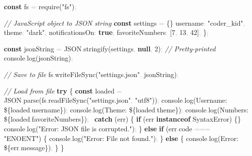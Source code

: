\documentclass[
  justified,
  openright,
]{tufte-book}
\newcommand{\KeywordTok}[1]{\textcolor{CodeKeyword}{\textbf{#1}}}  %
\newcommand{\StringTok}[1]{\textcolor{CodeString}{#1}}              %
\newcommand{\CommentTok}[1]{\textcolor{CodeComment}{\textit{#1}}}  %
\newcommand{\CodeNumTok}[1]{\textcolor{CodeNumber}{#1}}             %
\newcommand{\CodeFuncTok}[1]{\textcolor{CodeKeyword}{#1}}           %
\newcommand{\CodeTypeTok}[1]{\textcolor{CodeType}{#1}}              %
\newcommand{\CodeAccentTok}[1]{\textcolor{CodeAccent}{#1}}          %
\newcommand{\OperatorTok}[1]{\textcolor{DarkGray}{#1}}              %
\newenvironment{Shaded}{%
  \begin{mdframed}[style=TufteCode]%
}{%
  \end{mdframed}%
}
\begin{document}
\begin{Shaded}
\begin{Highlighting}[]
\KeywordTok{const} fs \OperatorTok{=} \CodeAccentTok{require}(\StringTok{"fs"})\OperatorTok{;}
 
\CommentTok{// JavaScript object to JSON string}
\KeywordTok{const} settings \OperatorTok{=} \{\}
  \CodeTypeTok{username}\OperatorTok{:} \StringTok{"coder\_kid"}\OperatorTok{,}
  \CodeTypeTok{theme}\OperatorTok{:} \StringTok{"dark"}\OperatorTok{,}
  \CodeTypeTok{notificationsOn}\OperatorTok{:} \KeywordTok{true}\OperatorTok{,}
  \CodeTypeTok{favoriteNumbers}\OperatorTok{:} [\CodeNumTok{7}\OperatorTok{,} \CodeNumTok{13}\OperatorTok{,} \CodeNumTok{42}]\OperatorTok{,}
\}\OperatorTok{;}
 
\KeywordTok{const} jsonString \OperatorTok{=} JSON\OperatorTok{.}\CodeFuncTok{stringify}(settings\OperatorTok{,} \KeywordTok{null}\OperatorTok{,} \CodeNumTok{2})\OperatorTok{;} \CommentTok{// Pretty{-}printed}
console\OperatorTok{.}\CodeFuncTok{log}(jsonString)\OperatorTok{;}
 
\CommentTok{// Save to file}
fs\OperatorTok{.}\CodeFuncTok{writeFileSync}(\StringTok{"settings.json"}\OperatorTok{,} jsonString)\OperatorTok{;}
 
\CommentTok{// Load from file}
\KeywordTok{try} \{
  \KeywordTok{const} loaded \OperatorTok{=} JSON\OperatorTok{.}\CodeFuncTok{parse}(fs\OperatorTok{.}\CodeFuncTok{readFileSync}(\StringTok{"settings.json"}\OperatorTok{,} \StringTok{"utf8"}))\OperatorTok{;}
  console\OperatorTok{.}\CodeFuncTok{log}(\StringTok{\textasciigrave{}Username: }\StringTok{\$\{}loaded\OperatorTok{.}\CodeTypeTok{username}\StringTok{\}}\StringTok{\textasciigrave{}})\OperatorTok{;}
  console\OperatorTok{.}\CodeFuncTok{log}(\StringTok{\textasciigrave{}Theme: }\StringTok{\$\{}loaded\OperatorTok{.}\CodeTypeTok{theme}\StringTok{\}}\StringTok{\textasciigrave{}})\OperatorTok{;}
  console\OperatorTok{.}\CodeFuncTok{log}(\StringTok{\textasciigrave{}Numbers: }\StringTok{\$\{}loaded\OperatorTok{.}\CodeTypeTok{favoriteNumbers}\StringTok{\}}\StringTok{\textasciigrave{}})\OperatorTok{;}
\ \KeywordTok{catch} (err) \{
  \KeywordTok{if} (err \KeywordTok{instanceof} SyntaxError) \{\}
    console\OperatorTok{.}\CodeFuncTok{log}(\StringTok{"Error: JSON file is corrupted."})\OperatorTok{;}
  \} \KeywordTok{else} \KeywordTok{if} (err\OperatorTok{.}\CodeTypeTok{code} \OperatorTok{===} \StringTok{"ENOENT"}) \{
    console\OperatorTok{.}\CodeFuncTok{log}(\StringTok{"Error: File not found."})\OperatorTok{;}
  \} \KeywordTok{else} \{
    console\OperatorTok{.}\CodeFuncTok{log}(\StringTok{\textasciigrave{}Error: }\StringTok{\$\{}err\OperatorTok{.}\CodeTypeTok{message}\StringTok{\}}\StringTok{\textasciigrave{}})\OperatorTok{;}
  \}
\}
\end{Highlighting}
\end{Shaded}
\end{document}
